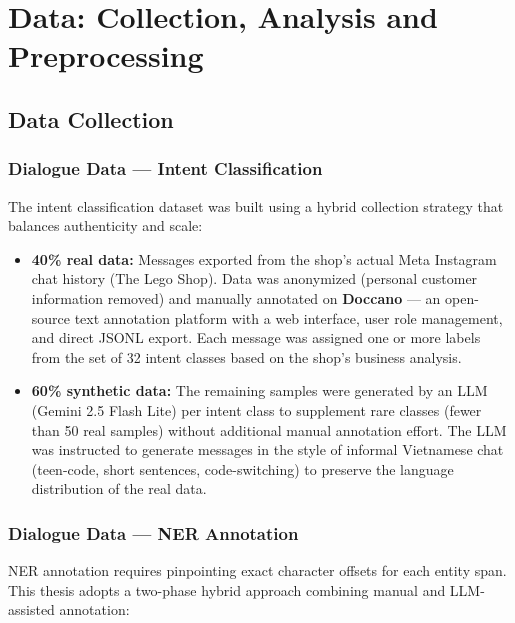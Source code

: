 \documentclass[12pt, a4paper]{report}
\begin{document}
\chapter{Data: Collection, Analysis and Preprocessing}

\section{Data Collection}

\subsection{Dialogue Data --- Intent Classification}

The intent classification dataset was built using a hybrid collection strategy
that balances authenticity and scale:

\begin{itemize}
  \item \textbf{40\% real data:} Messages exported from the shop's actual
        Meta Instagram chat history (The Lego Shop).
        Data was anonymized (personal customer information removed)
        and manually annotated on \textbf{Doccano} \cite{doccano2018} ---
        an open-source text annotation platform with a web interface,
        user role management, and direct JSONL export.
        Each message was assigned one or more labels from the set of 32 intent classes
        based on the shop's business analysis.

  \item \textbf{60\% synthetic data:} The remaining samples were generated
        by an LLM (Gemini 2.5 Flash Lite) per intent class
        to supplement rare classes (fewer than 50 real samples)
        without additional manual annotation effort.
        The LLM was instructed to generate messages in the style of
        informal Vietnamese chat (teen-code, short sentences, code-switching)
        to preserve the language distribution of the real data.
\end{itemize}

\subsection{Dialogue Data --- NER Annotation}
\label{subsec:ner_annotation}

NER annotation requires pinpointing exact character offsets for each entity span.
This thesis adopts a two-phase hybrid approach combining manual and LLM-assisted annotation:
\end{document}
